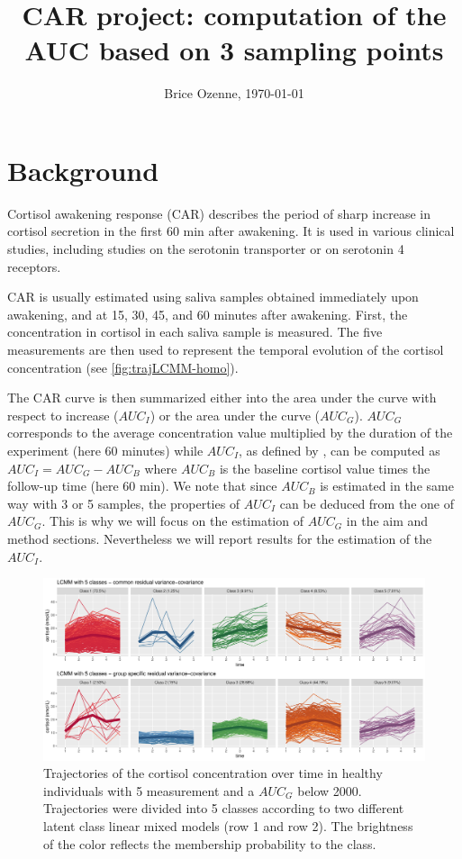 \documentclass[12pt]{article}
\author{Brice Ozenne, \today}
\date{}
\title{CAR project: computation of the AUC based on 3 sampling points}
\begin{document}
\maketitle

\section{Background}
\label{sec:org7fb3156}

Cortisol awakening response (CAR) describes the period of sharp
increase in cortisol secretion in the first 60 min after awakening. It
is used in various clinical studies, including studies on the
serotonin transporter or on serotonin 4 receptors.

\bigskip

CAR is usually estimated using saliva samples obtained immediately
upon awakening, and at 15, 30, 45, and 60 minutes after
awakening. First, the concentration in cortisol in each saliva sample
is measured. The five measurements are then used to represent the
temporal evolution of the cortisol concentration (see
\autoref{fig:trajLCMM-homo}).

\bigskip

The CAR curve is then summarized either into the area under the curve
with respect to increase (\(AUC_I\)) or the area under the curve
(\(AUC_G\)). \(AUC_G\) corresponds to the average concentration value
multiplied by the duration of the experiment (here 60 minutes) while
\(AUC_I\), as defined by \cite{fekedulegn2007area}, can be computed as
\(AUC_I = AUC_G - AUC_B\) where \(AUC_B\) is the baseline cortisol
value times the follow-up time (here 60 min). We note that since
\(AUC_B\) is estimated in the same way with 3 or 5 samples, the
properties of \(AUC_I\) can be deduced from the one of \(AUC_G\). This
is why we will focus on the estimation of \(AUC_G\) in the aim and
method sections. Nevertheless we will report results for the
estimation of the \(AUC_I\).


\begin{figure}[!h]
\centering
\includegraphics[width=\textwidth]{./figures/trajLCMM-5groups.pdf}
\caption{\label{fig:trajLCMM-homo}Trajectories of the cortisol concentration over time in healthy individuals with 5 measurement and a \(AUC_G\) below 2000. Trajectories were divided into 5 classes according to two different latent class linear mixed models (row 1 and row 2). The brightness of the color reflects the membership probability to the class.}
\end{figure}
\end{document}
